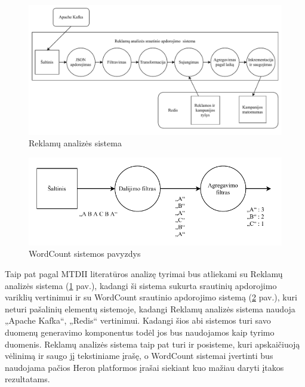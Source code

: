 \documentclass{VUMIFPSbakalaurinis}
\begin{document}
\begin{figure}[H]
    \includegraphics[width=15cm]{img/yahoo.pdf}
    \caption{Reklamų analizės sistema \cite{Chintapalli2016Benchmarking}}
    \label{yahoo}
\end{figure} 

\begin{figure}[H]
    \includegraphics[width=15cm]{img/wordcount.pdf}
    \caption{WordCount sistemos pavyzdys}
    \label{wordcount}
\end{figure} 

Taip pat pagal MTDII literatūros analizę tyrimai bus atliekami su Reklamų analizės sistema (\ref{yahoo} pav.), kadangi ši sistema sukurta srautinių apdorojimo variklių vertinimui ir su WordCount srautinio apdorojimo sistemą (\ref{wordcount} pav.), kuri neturi pašalinių elementų sistemoje, kadangi Reklamų analizės sistema naudoja „Apache Kafka“, „Redis“ vertinimui.
Kadangi šios abi sistemos turi savo duomenų generavimo komponentus todėl jos bus naudojamos kaip tyrimo duomenis. Reklamų analizės sistema taip pat turi ir posisteme, kuri apskaičiuoją vėlinimą ir saugo jį tekstiniame įrašę, o WordCount sistemai įvertinti bus naudojama pačios Heron platformos įrašai siekiant kuo mažiau daryti įtakos rezultatams.
\end{document}
